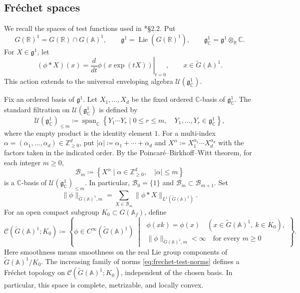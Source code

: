 \documentclass[12pt]{amsart}
\theoremstyle{definition}
\theoremstyle{plain}
\theoremstyle{remark}
\def\C{\mathbb{C}}%
\def\R{\mathbb{R}}%
\def\A{\mathbb{A}}%
\DeclareMathOperator{\Lie}{Lie}%
\newcommand{\fg}{\mathfrak{g}}
\newcommand{\cC}{\mathcal{C}}
\newcommand{\cU}{\mathcal{U}}
\numberwithin{equation}{section}
\newcommand{\tG}{\widetilde{G}}
\begin{document}
\subsection{Fr\'echet spaces}\label{sec:Frechet}


We recall the spaces of test functions used in
\cite{FL16}*{\S2.2}.
Put
\[
 G(\R)^1=G(\R)\cap G(\A)^1,\qquad
 \fg^1=\Lie(G(\R)^1),\qquad
 \fg_\C^1=\fg^1\otimes_\R\C.
\]
For $X\in\fg^1$, let
\[
 (\phi*X)(x)
   =\left.\frac{d}{dt}\phi(x\exp(tX))\right|_{t=0},
 \qquad x\in \tG(\A)^1.
\]
This action extends to the universal enveloping algebra
$\cU(\fg_\C^1)$.


Fix an ordered basis of $\fg^1$.
Let $X_1,\ldots,X_d$ be the fixed ordered $\C$-basis of $\fg_\C^1$.
The standard filtration on $\cU(\fg_\C^1)$ is defined by
\[
 \cU(\fg_\C^1)_{\leq m}
 \coloneqq
 \operatorname{span}_\C
 \left\{
 Y_1\cdots Y_r\mid
 0\leq r\leq m,\quad Y_1,\ldots,Y_r\in\fg_\C^1
 \right\},
\]
where the empty product is the identity element $1$.
For a multi-index $\alpha=(\alpha_1,\ldots,\alpha_d)\in\mathbb Z_{\geq0}^d$, put $|\alpha|\coloneqq \alpha_1+\cdots+\alpha_d$ and $X^\alpha\coloneqq X_1^{\alpha_1}\cdots X_d^{\alpha_d}$ with the factors taken in the indicated order.
By the Poincar\'e--Birkhoff--Witt theorem, for each integer $m\geq0$,
\[
 \mathcal B_m
 \coloneqq
 \left\{
 X^\alpha\mid
 \alpha\in\mathbb Z_{\geq0}^d,\quad |\alpha|\leq m
 \right\}
\]
is a $\C$-basis of $\cU(\fg_\C^1)_{\leq m}$.
In particular, $\mathcal B_0=\{1\}$ and
$\mathcal B_m\subset\mathcal B_{m+1}$.
Set
\begin{equation}
 \|\phi\|_{\tG(\A)^1,m}
   =\sum_{X\in\mathcal B_m}
        \|\phi*X\|_{L^1(\tG(\A)^1)}.
 \label{eq:frechet-test-norms}
\end{equation}
For an open compact subgroup $K_0\subset G(\A_f)$, define
\[
 \cC(\tG(\A)^1;K_0)
   \coloneqq \left\{\phi\in C^\infty(\tG(\A)^1) \; \middle| \; 
       \begin{array}{l}
        \phi(xk)=\phi(x)\quad
            (x\in \tG(\A)^1,\ k\in K_0),\\
        \|\phi\|_{\tG(\A)^1,m}<\infty
            \quad\text{for every }m\geq0
       \end{array}
     \right\}.
\]
Here smoothness means smoothness on the real Lie group
components of $\tG(\A)^1/K_0$.
The increasing family of norms
\eqref{eq:frechet-test-norms} defines a Fr\'echet topology on
$\cC(\tG(\A)^1;K_0)$, independent of the chosen basis.
In particular, this space is complete, metrizable, and locally
convex.
\end{document}
